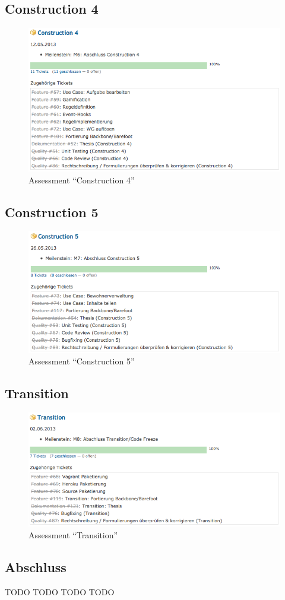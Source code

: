\subsection*{Construction 4}
\begin{figure}[H]
	\centering
	\includegraphics[width=13cm]{content/appendix/projectmanagement/images/assessment/construction4.png}
	\caption{Assessment ``Construction 4''}
\end{figure}

\subsection*{Construction 5}
\begin{figure}[H]
	\centering
	\includegraphics[width=13cm]{content/appendix/projectmanagement/images/assessment/construction5.png}
	\caption{Assessment ``Construction 5''}
\end{figure}

\subsection*{Transition}
\begin{figure}[H]
	\centering
	\includegraphics[width=13cm]{content/appendix/projectmanagement/images/assessment/transition.png}
	\caption{Assessment ``Transition''}
\end{figure}

\subsection*{Abschluss}
TODO TODO TODO TODO